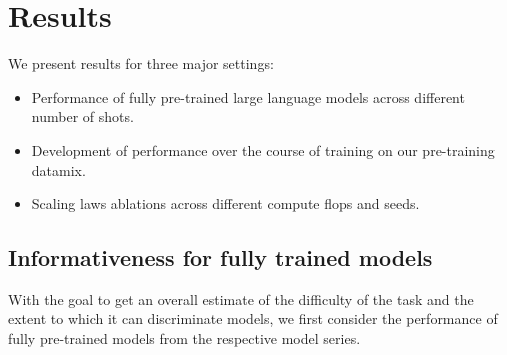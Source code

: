\section{Results}

We present results for three major settings:
\begin{itemize}
    \item Performance of fully pre-trained large language models across different number of shots.
    \item Development of performance over the course of training on our pre-training datamix.
    \item Scaling laws ablations across different compute flops and seeds.
\end{itemize}

\subsection{Informativeness for fully trained models}


With the goal to get an overall estimate of the difficulty of the task and the extent to which it can discriminate models, we first consider the performance of fully pre-trained models from the respective model series.

